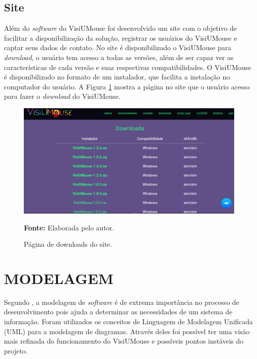 \section{Site}\label{sub:visiumouse-objtivo-site}
Além do \textit{software} do VisiUMouse foi desenvolvido um site com o objetivo de facilitar a disponibilização da solução, registrar os usuários do VisiUMouse e captar seus dados de contato. 
No site é disponibilizado o VisiUMouse para \textit{download}, o usuário tem acesso a todas as versões, além de ser capaz ver as características de cada versão e suas respectivas compatibilidades. O VisiUMouse é disponibilizado no formato de um instalador, que facilita a instalação no computador do usuário. A Figura \ref{fig:site-download} mostra a página no site que o usuário acesso para fazer o \textit{download} do VisiUMouse.


\begin{figure}[H]
\caption{Página de downloads do site.} 
\centering \includegraphics[scale=0.35]{img/site-download.png}

{\fontsize{11}{11}\selectfont \textbf{Fonte:} Elaborada pelo autor.}
\label{fig:site-download}
\end{figure}


\chapter{MODELAGEM}\label{CAP5}

Segundo , a modelagem de \textit{software} é de extrema importância no processo de desenvolvimento pois ajuda a determinar as necessidades de um sistema de informação. Foram utilizados os conceitos de Linguagem de Modelagem Unificada (UML) para a modelagem de diagramas. Através deles foi possível ter uma visão mais refinada do funcionamento do VisiUMouse e possíveis pontos instáveis do projeto.


